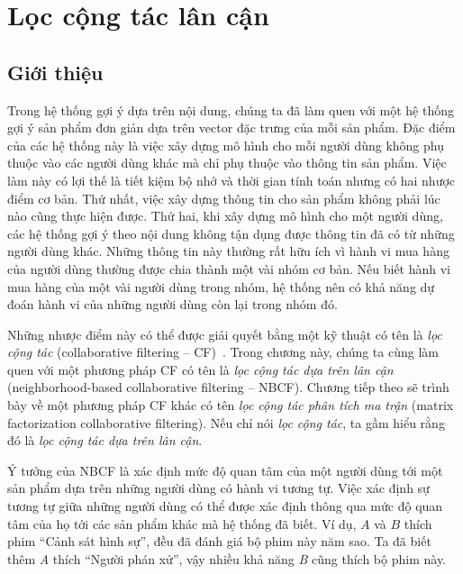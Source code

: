 \chapter{Lọc cộng tác lân cận}
\label{cha:CF}

\section{Giới thiệu}


Trong hệ thống gợi ý dựa trên nội dung, chúng ta đã làm quen với một hệ thống
gợi ý sản phẩm đơn giản dựa trên vector đặc trưng của mỗi sản phẩm. Đặc điểm của
các hệ thống này là việc xây dựng mô hình cho mỗi người dùng không phụ thuộc vào
các người dùng khác mà chỉ phụ thuộc vào thông tin sản phẩm. Việc làm này có lợi
thế là tiết kiệm bộ nhớ và thời gian tính toán nhưng có hai nhược điểm cơ bản.
Thứ nhất, việc xây dựng thông tin cho sản phẩm không phải lúc nào cũng thực hiện
được. Thứ hai, khi xây dựng mô hình cho một người dùng, các hệ thống gợi ý theo
nội dung không tận dụng được thông tin đã có từ những người dùng khác. Những
thông tin này thường rất hữu ích vì hành vi mua hàng của người dùng thường được
chia thành một vài nhóm cơ bản. Nếu biết hành vi mua hàng của một vài người dùng
trong nhóm, hệ thống nên có khả năng dự đoán hành vi của những người dùng còn
lại trong nhóm đó.

Những nhược điểm này có thể được giải quyết bằng một kỹ thuật có tên là \textit{lọc cộng tác} (collaborative filtering -- CF)~\cite{schafer2007collaborative,
ekstrand2011collaborative}. Trong chương này, chúng ta cùng làm quen với một
phương pháp CF có tên là \textit{lọc cộng tác dựa trên lân cận} (neighborhood-based collaborative filtering -- NBCF). Chương tiếp theo sẽ trình bày về một phương pháp CF khác có tên \textit{lọc cộng tác phân tích ma trận}
(matrix factorization collaborative filtering). Nếu chỉ nói
\textit{lọc cộng tác}, ta gầm hiểu rằng đó là
\textit{lọc cộng tác dựa trên lân cận}.

Ý tưởng của NBCF là xác định {mức độ quan tâm} của một người dùng tới một sản
phẩm dựa trên những người dùng có hành vi tương tự. Việc xác định sự tương tự
giữa những người dùng có thể được xác định thông qua {mức độ quan tâm} của họ
tới các sản phẩm khác mà hệ thống đã biết.  Ví dụ, $A$ và $B$ thích phim
``{Cảnh sát hình sự}'', đều đã đánh giá bộ phim này năm sao. Ta đã biết thêm
\textit{A} thích ``{Người phán xử}'', vậy nhiều khả năng \textit{B} cũng
thích bộ phim này.

